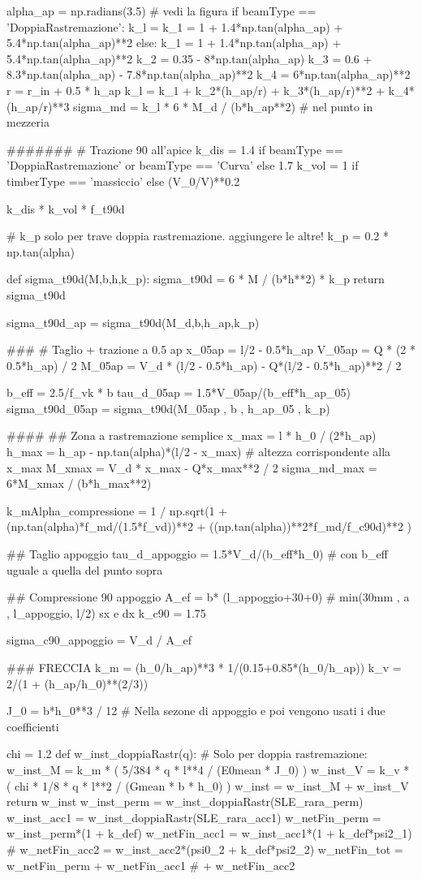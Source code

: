 \begin{pycode}[TraveDoppiaRastremazione]
alpha_ap = np.radians(3.5) # vedi la figura
if beamType == 'DoppiaRastremazione':
    k_l = k_1 = 1 + 1.4*np.tan(alpha_ap) + 5.4*np.tan(alpha_ap)**2
else:
    k_1 = 1 + 1.4*np.tan(alpha_ap) + 5.4*np.tan(alpha_ap)**2
    k_2 = 0.35 - 8*np.tan(alpha_ap)
    k_3 = 0.6 + 8.3*np.tan(alpha_ap) - 7.8*np.tan(alpha_ap)**2
    k_4 = 6*np.tan(alpha_ap)**2
    r = r_in + 0.5 * h_ap
    k_l = k_1 + k_2*(h_ap/r) + k_3*(h_ap/r)**2 + k_4*(h_ap/r)**3
sigma_md = k_l * 6 * M_d / (b*h_ap**2) # nel punto in mezzeria

#######
# Trazione 90 all'apice
k_dis =  1.4 if beamType == 'DoppiaRastremazione' or  beamType == 'Curva' else  1.7
k_vol = 1 if timberType == 'massiccio' else (V_0/V)**0.2 

k_dis * k_vol * f_t90d

# k_p solo per trave doppia rastremazione. aggiungere le altre!
k_p = 0.2 * np.tan(alpha) 

def sigma_t90d(M,b,h,k_p):
    sigma_t90d = 6 * M / (b*h**2) * k_p
    return sigma_t90d

sigma_t90d_ap = sigma_t90d(M_d,b,h_ap,k_p)

###
# Taglio + trazione a 0.5 ap
x_05ap = l/2 - 0.5*h_ap
V_05ap = Q * (2 * 0.5*h_ap) / 2
M_05ap = V_d * (l/2 - 0.5*h_ap) - Q*(l/2 - 0.5*h_ap)**2 / 2


b_eff = 2.5/f_vk * b
tau_d_05ap = 1.5*V_05ap/(b_eff*h_ap_05)
sigma_t90d_05ap = sigma_t90d(M_05ap , b , h_ap_05 , k_p)

####
## Zona a rastremazione semplice
x_max = l * h_0 / (2*h_ap)
h_max = h_ap - np.tan(alpha)*(l/2 - x_max) # altezza corrispondente alla x_max
M_xmax = V_d * x_max - Q*x_max**2 / 2
sigma_md_max = 6*M_xmax / (b*h_max**2)


k_mAlpha_compressione = 1 / np.sqrt(1 + (np.tan(alpha)*f_md/(1.5*f_vd))**2 + ((np.tan(alpha))**2*f_md/f_c90d)**2 )

## Taglio appoggio
tau_d_appoggio = 1.5*V_d/(b_eff*h_0)
# con b_eff uguale a quella del punto sopra

## Compressione 90 appoggio
A_ef = b* (l_appoggio+30+0) # min(30mm , a , l_appoggio, l/2) sx e dx
k_c90 = 1.75

sigma_c90_appoggio = V_d / A_ef

### FRECCIA
k_m = (h_0/h_ap)**3 * 1/(0.15+0.85*(h_0/h_ap))
k_v = 2/(1 + (h_ap/h_0)**(2/3))

J_0 = b*h_0**3 / 12 # Nella sezone di appoggio e poi vengono usati i due coefficienti

chi = 1.2
def w_inst_doppiaRastr(q): # Solo per doppia rastremazione:
    w_inst_M = k_m * ( 5/384 * q * l**4 / (E0mean * J_0) )
    w_inst_V = k_v * ( chi * 1/8 * q * l**2 / (Gmean * b * h_0) )
    w_inst = w_inst_M + w_inst_V
    return w_inst
w_inst_perm = w_inst_doppiaRastr(SLE_rara_perm)
w_inst_acc1 = w_inst_doppiaRastr(SLE_rara_acc1)
w_netFin_perm = w_inst_perm*(1 + k_def)
w_netFin_acc1 = w_inst_acc1*(1 + k_def*psi2_1)
# w_netFin_acc2 = w_inst_acc2*(psi0_2 + k_def*psi2_2)
w_netFin_tot = w_netFin_perm + w_netFin_acc1 # + w_netFin_acc2

\end{pycode}

